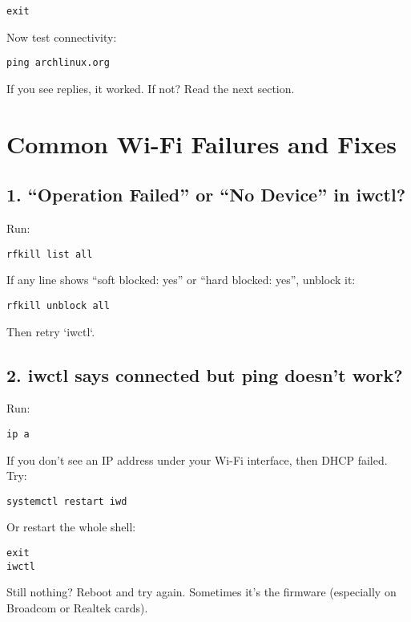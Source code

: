 \documentclass[12pt]{book}
\begin{document}
\begin{lstlisting}
exit
\end{lstlisting}

Now test connectivity:

\begin{lstlisting}
ping archlinux.org
\end{lstlisting}

If you see replies, it worked. If not? Read the next section.

\section{Common Wi-Fi Failures and Fixes}

\subsection*{1. “Operation Failed” or “No Device” in iwctl?}

Run:

\begin{lstlisting}
rfkill list all
\end{lstlisting}

If any line shows “soft blocked: yes” or “hard blocked: yes”, unblock it:

\begin{lstlisting}
rfkill unblock all
\end{lstlisting}

Then retry `iwctl`.

\subsection*{2. iwctl says connected but ping doesn’t work?}

Run:

\begin{lstlisting}
ip a
\end{lstlisting}

If you don’t see an IP address under your Wi-Fi interface, then DHCP failed. Try:

\begin{lstlisting}
systemctl restart iwd
\end{lstlisting}

Or restart the whole shell:

\begin{lstlisting}
exit
iwctl
\end{lstlisting}

Still nothing? Reboot and try again. Sometimes it’s the firmware (especially on Broadcom or Realtek cards).
\end{document}
